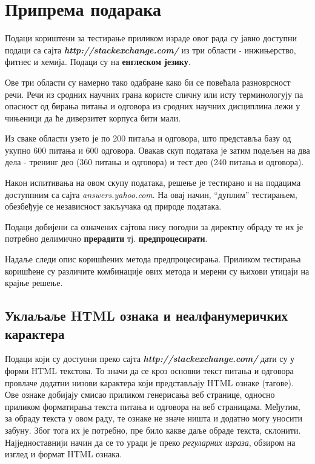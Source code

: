 \chapter{Припрема подарака}

Подаци  кориштени за тестирање приликом израде овог рада су јавно доступни подаци са сајта \textbf{\textit{http://stackexchange.com/}} из три области  - инжињерство, фитнес и хемија. Подаци су на \textbf{енглеском језику}. 

Ове три области су намерно тако одабране како би се повећала разноврсност речи. Речи из сродних научних грана користе сличну или исту терминологују па опасност од бирања питања и одговора из  сродних научних дисциплина лежи у чињеници да ће диверзитет корпуса бити мали.

Из сваке области узето је по 200 питаља и одговора, што представља базу од укупно 600 питања и 600 одговора. Овакав скуп података је затим подељен на два дела - тренинг део (360 питања и одговора) и тест део (240 питања и одговора).

Након испитивања на овом скупу података, решење је тестирано и на подацима доступпним са сајта \textit{answers.yahoo.com}. На овај начин, "`дуплим"' тестирањем, обезбеђује се независност закључака од природе података.

Подаци добијени са означених сајтова нису погодни за директну обраду те их је потребно делимично \textbf{прерадити} тј. \textbf{предпроцесирати}. 

Надаље следи опис коришћених метода предпроцесирања. Приликом тестирања коришћене су различите комбинације ових метода и мерени су њихови утицаји на крајње решење.


	\section{Уклаљаље HTML ознака и неалфанумеричких карактера }
	
Подаци који су достуони преко сајта \textbf{\textit{http://stackexchange.com/}} дати су у форми HTML текстова. То значи да се кроз основни текст питања и одговора провлаче додатни низови карактера који представљају HTML ознаке (тагове). Ове ознаке добијају смисао приликом генерисања веб странице, односно приликом форматирања текста питања и одговора на веб страницама. Међутим, за обраду текста у овом раду, те ознаке не значе ништа и додатно могу уносити забуну. Због тога их је потребно, пре било какве даље обраде текста, склонити. Најједноставнији начин да се то уради је преко \textit{регуларних израза}, обзиром на изглед и формат HTML ознака.


